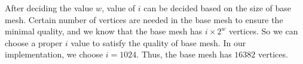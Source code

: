     After deciding the value $w$, value of $i$ can be decided 
    based on the size of base mesh. 
    Certain number of vertices are needed in the base mesh to ensure 
    the minimal quality, and we know that the base mesh has $i \times 2^{w}$ vertices.
    So we can choose a proper $i$ value to satisfy the quality
    of base mesh. 
    In our implementation, we choose $i= 1024$. 
    Thus, the base mesh has
    $16382$ vertices.
%
%
%
%
%
%


